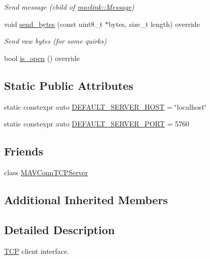 \begin{DoxyCompactItemize}
\begin{DoxyCompactList}\small\item\em Send message (child of \mbox{\hyperlink{structmavlink_1_1Message}{mavlink\+::\+Message}}) \end{DoxyCompactList}\item 
void \mbox{\hyperlink{group__mavconn_gac327ab4a27b6de2da3c594d93c599312}{send\+\_\+bytes}} (const uint8\+\_\+t $\ast$bytes, size\+\_\+t length) override
\begin{DoxyCompactList}\small\item\em Send raw bytes (for some quirks) \end{DoxyCompactList}\item 
bool \mbox{\hyperlink{group__mavconn_gadcabe763ecf8fc00e123fcf78af9eaf4}{is\+\_\+open}} () override
\end{DoxyCompactItemize}
\subsection*{Static Public Attributes}
\begin{DoxyCompactItemize}
\item 
static constexpr auto \mbox{\hyperlink{group__mavconn_ga25f08b85aaeacae255d37a898f978c42}{D\+E\+F\+A\+U\+L\+T\+\_\+\+S\+E\+R\+V\+E\+R\+\_\+\+H\+O\+ST}} = \char`\"{}localhost\char`\"{}
\item 
static constexpr auto \mbox{\hyperlink{group__mavconn_ga3d9c438ece25a8aa6ae7af15341e7706}{D\+E\+F\+A\+U\+L\+T\+\_\+\+S\+E\+R\+V\+E\+R\+\_\+\+P\+O\+RT}} = 5760
\end{DoxyCompactItemize}
\subsection*{Friends}
\begin{DoxyCompactItemize}
\item 
class \mbox{\hyperlink{group__mavconn_gaa93ce54993292c6350cf74aa47fde6cd}{M\+A\+V\+Conn\+T\+C\+P\+Server}}
\end{DoxyCompactItemize}
\subsection*{Additional Inherited Members}


\subsection{Detailed Description}
\mbox{\hyperlink{classTCP}{T\+CP}} client interface. 

